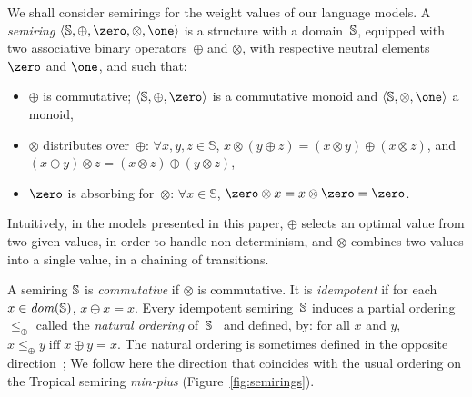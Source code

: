 %
%
We shall consider semirings for the weight values of our language models.
%
A \emph{semiring} $\< \Semiring, \oplus, \zero, \otimes, \one>$ 
is a structure with a domain~$\mathbb{S}$,
equipped with two associative
binary operators~$\oplus$ and $\otimes$,
with respective neutral elements $\zero$ and $\one$, and such that:
\begin{itemize}
\item $\oplus$ is commutative;
 $\< \Semiring, \oplus, \zero>$ is a commutative monoid 
   and $\< \Semiring, \otimes, \one>$ a monoid,
\item $\otimes$ distributes over~$\oplus$:  $\forall x, y, z \in \mathbb{S}$,
$x \otimes (y \oplus z) = (x \otimes y) \oplus (x \otimes z)$, 
and $(x \oplus y) \otimes z = (x \otimes z) \oplus (y \otimes z)$,
\item $\zero$ is absorbing for~$\otimes$: 
$\forall x\in \mathbb{S}$, $\zero \otimes x = x \otimes \zero = \zero$.
\end{itemize}
%
Intuitively, in the models presented in this paper, 
$\oplus$ selects an optimal value from two given values, 
in order to handle non-determinism, 
and $\otimes$ combines two values into a single value, 
in a chaining of transitions.

\medskip%
A semiring $\mathbb{S}$ is \emph{commutative} if $\otimes$ is commutative.
It is \emph{idempotent} if for each $x \in \mathit{dom}(\mathbb{S})$, $x \oplus x = x$.
%
Every idempotent semiring~$\mathbb{S}$ induces 
a partial ordering~$\leq_\oplus$ 
called the \emph{natural ordering} of~$\mathbb{S}$~\cite{Mohri02semiring} 
and defined,  by: 
for all $x$ and $y$,
$x \leq_\oplus y \;\mbox{iff}\; x \oplus y = x$.
%
The natural ordering is sometimes defined in the opposite direction~\cite{DrosteKuich09semirings};
We follow here the direction  %
that coincides with the usual ordering on the Tropical semiring \emph{min-plus} 
(Figure~\ref{fig:semirings}).

